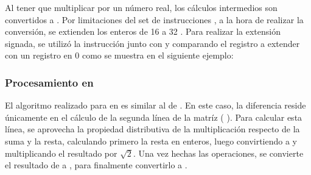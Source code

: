 Al tener que multiplicar por un número real, los cálculos intermedios son convertidos a . Por limitaciones del set de instrucciones
, a la hora de realizar la conversión, se extienden los enteros de 16  a 32 . Para realizar la extensión signada,
se utilizó la instrucción  junto con  y  comparando el registro a extender con un registro en 0 como se 
muestra en el siguiente ejemplo:
\begin{center}
\end{center}

\subsubsection{Procesamiento en }
	El algoritmo realizado para  en  es similar al de . En este caso, la diferencia reside 
únicamente en el cálculo de la segunda línea de la matríz (
). Para calcular esta línea, se aprovecha la propiedad distributiva de la multiplicación respecto de la suma y la resta, calculando primero la resta 
en enteros, luego convirtiendo a  y multiplicando el resultado por $\sqrt{2}$. Una vez hechas las operaciones, se convierte el resultado 
de  a , para finalmente convertirlo a .

